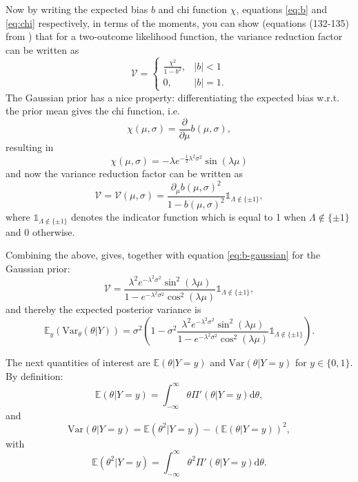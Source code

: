 \documentclass[]{report}
\begin{document}
Now by writing the expected bias $b$ and chi function $\chi$, equations \eqref{eq:b} and \eqref{eq:chi} respectively, in terms of the moments, you can show (equations (132-135) from \cite{Koh2020}) that for a two-outcome likelihood function, the variance reduction factor can be written as
\begin{equation}
    \mathcal{V} = \begin{cases}
        \frac{\chi^2}{1-b^2},   & |b|<1\\
        0,                      & |b|=1.
    \end{cases}
\end{equation}
The Gaussian prior has a nice property: differentiating the expected bias w.r.t. the prior mean gives the chi function, i.e.
\begin{equation}
\label{eq:chi-diff}
    \chi(\mu, \sigma) = \frac{\partial}{\partial\mu}b(\mu, \sigma),
\end{equation}
resulting in
\begin{equation}
\label{eq:chi-gaussian}
    \chi(\mu, \sigma) = - \lambda e^{-\frac{1}{2}\lambda^2\sigma^2}\sin(\lambda\mu)
\end{equation}
and now the variance reduction factor can be written as
\begin{equation}
    \mathcal{V} = \mathcal{V}(\mu, \sigma) = \frac{\partial_{\mu}b(\mu, \sigma)^2}{1 - b(\mu, \sigma)^2} \mathbb{1}_{\Lambda \notin \{\pm1\}},
\end{equation}
where $\mathbb{1}_{\Lambda \notin \{\pm1\}}$ denotes the indicator function which is equal to 1 when $\Lambda \notin \{\pm1\}$ and $0$ otherwise.

Combining the above, gives, together with equation \eqref{eq:b-gaussian} for the Gaussian prior:
\begin{equation}
    \mathcal{V} = \frac{\lambda^2 e^{-\lambda^2\sigma^2} \sin^2(\lambda\mu)}{1-e^{-\lambda^2\sigma^2} \cos^2(\lambda\mu)}\mathbb{1}_{\Lambda \notin \{\pm1\}},
\end{equation}
and thereby the expected posterior variance is
\begin{equation}
    \mathbb{E}_y(\text{Var}_{\theta}(\theta | Y)) = \sigma^2(1-\sigma^2\frac{\lambda^2 e^{-\lambda^2\sigma^2} \sin^2(\lambda\mu)}{1-e^{-\lambda^2\sigma^2} \cos^2(\lambda\mu)}\mathbb{1}_{\Lambda \notin \{\pm1\}}).
\end{equation}

The next quantities of interest are $\mathbb{E}(\theta | Y=y)$ and $\text{Var}(\theta|Y=y)$ for $y\in \{0,1\}$. By definition:
\begin{equation}
    \mathbb{E}(\theta | Y=y) = \int_{-\infty}^{\infty} \theta \Pi'(\theta|Y=y)\text{d}\theta,
\end{equation}
and
\begin{equation}
    \text{Var}(\theta|Y=y) = \mathbb{E}(\theta^2 | Y=y) - (\mathbb{E}(\theta | Y=y))^2,
\end{equation}
with
\begin{equation}
    \mathbb{E}(\theta^2 | Y=y) = \int_{-\infty}^{\infty} \theta^2 \Pi'(\theta|Y=y)\text{d}\theta.
\end{equation}
\end{document}
